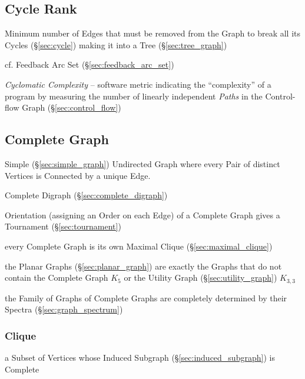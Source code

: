 \subsection{Cycle Rank}\label{sec:cycle_rank}

Minimum number of Edges that must be removed from the Graph to break all its
Cycles (\S\ref{sec:cycle}) making it into a Tree (\S\ref{sec:tree_graph})

\fist cf. Feedback Arc Set (\S\ref{sec:feedback_arc_set})

\emph{Cyclomatic Complexity} -- software metric indicating the ``complexity''
of a program by measuring the number of linearly independent \emph{Paths} in
the Control-flow Graph (\S\ref{sec:control_flow})



\subsection{Complete Graph}\label{sec:complete_graph}

Simple (\S\ref{sec:simple_graph}) Undirected Graph where every Pair of
distinct Vertices is Connected by a unique Edge.

Complete Digraph (\S\ref{sec:complete_digraph})

Orientation (assigning an Order on each Edge) of a Complete Graph
gives a Tournament (\S\ref{sec:tournament})

every Complete Graph is its own Maximal Clique (\S\ref{sec:maximal_clique})

the Planar Graphs (\S\ref{sec:planar_graph}) are exactly the Graphs that do not
contain the Complete Graph $K_5$ or the Utility Graph
(\S\ref{sec:utility_graph}) $K_{3,3}$

the Family of Graphs of Complete Graphs are completely determined by their
Spectra (\S\ref{sec:graph_spectrum})



\subsubsection{Clique}\label{sec:clique}

a Subset of Vertices whose Induced Subgraph (\S\ref{sec:induced_subgraph}) is
Complete


